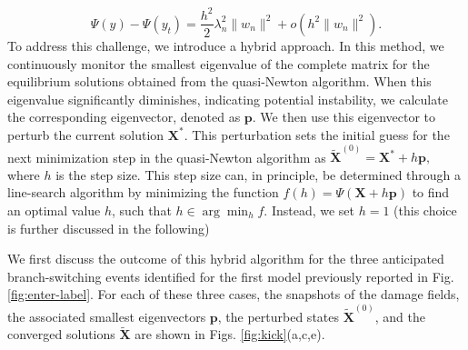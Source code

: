 $$
\Psi(y)-\Psi(y_t)= \frac{h^2}{2}\lambda^2_n \|w_n\|^2+o(h^2\|w_n\|^2).
$$
To address this challenge, we introduce a hybrid approach. In this method, we continuously monitor the smallest eigenvalue of the complete  matrix for the equilibrium solutions obtained from the quasi-Newton algorithm. 
When this eigenvalue significantly diminishes, indicating potential instability, we calculate the corresponding eigenvector, denoted as \(\mathbf{p}\). We then use this eigenvector to perturb the current solution $\mathbf{X^*}$. This perturbation sets the initial guess for the next minimization step in the quasi-Newton algorithm as $\mathbf{\tilde X}^{(0)} = \mathbf{X^*} + h \mathbf{p},
$ where \(h\) is the step size.
This step size can, in principle, be determined through a line-search algorithm by minimizing the function $f(h) = \Psi(\mathbf{X} + h \mathbf{p})$ to find an optimal value \(h\), such that $h \in \arg \min_{h} f$. Instead, we   set \(h = 1\)  (this choice is further discussed in the following) 

We first discuss the outcome of this hybrid algorithm for the three anticipated branch-switching events identified for the first model previously reported in Fig. \ref{fig:enter-label}. For each of these three cases, the snapshots of the damage fields, the associated smallest eigenvectors \(\mathbf{p}\),  the perturbed states \(\mathbf{\tilde X}^{(0)}\), and the converged solutions $\mathbf{\tilde X}$ are shown in Figs. \ref{fig:kick}(a,c,e).

